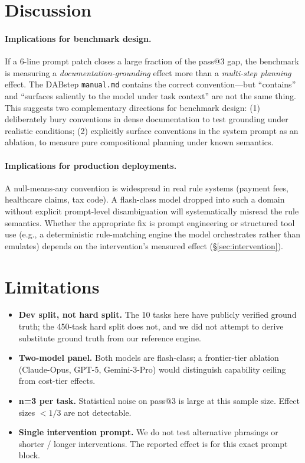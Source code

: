 \documentclass[11pt]{article}
\begin{document}
\section{Discussion}

\paragraph{Implications for benchmark design.} If a 6-line prompt patch closes a large
fraction of the pass@3 gap, the benchmark is measuring a \emph{documentation-grounding} effect
more than a \emph{multi-step planning} effect. The DABstep \texttt{manual.md} contains the
correct convention---but ``contains'' and ``surfaces saliently to the model under task context''
are not the same thing. This suggests two complementary directions for benchmark design:
(1) deliberately bury conventions in dense documentation to test grounding under
realistic conditions; (2) explicitly surface conventions in the system prompt as an ablation,
to measure pure compositional planning under known semantics.

\paragraph{Implications for production deployments.} A null-means-any convention is widespread
in real rule systems (payment fees, healthcare claims, tax code). A flash-class model dropped
into such a domain without explicit prompt-level disambiguation will systematically misread
the rule semantics. Whether the appropriate fix is prompt engineering or structured tool use
(e.g., a deterministic rule-matching engine the model orchestrates rather than emulates)
depends on the intervention's measured effect (\S\ref{sec:intervention}).

\section{Limitations}

\begin{itemize}[topsep=0pt,itemsep=0pt]
  \item \textbf{Dev split, not hard split.} The 10 tasks here have publicly verified ground
        truth; the 450-task hard split does not, and we did not attempt to derive substitute
        ground truth from our reference engine.
  \item \textbf{Two-model panel.} Both models are flash-class; a frontier-tier ablation
        (Claude-Opus, GPT-5, Gemini-3-Pro) would distinguish capability ceiling from cost-tier
        effects.
  \item \textbf{n=3 per task.} Statistical noise on pass@3 is large at this sample size.
        Effect sizes $< 1/3$ are not detectable.
  \item \textbf{Single intervention prompt.} We do not test alternative phrasings or shorter
        / longer interventions. The reported effect is for this exact prompt block.
\end{itemize}
\end{document}

